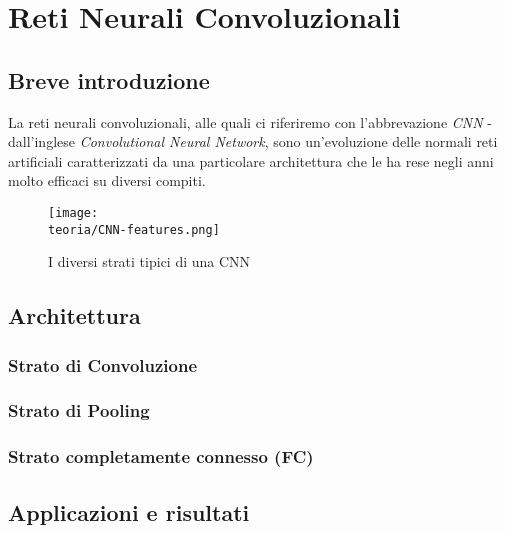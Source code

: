 
\chapter{Reti Neurali Convoluzionali} %

\label{Capitolo2} %
\def \teoria {Figures/teoria}


\section{Breve introduzione}
La reti neurali convoluzionali, alle quali ci riferiremo con l'abbrevazione \emph{CNN} - dall'inglese \emph{Convolutional Neural Network}, sono un'evoluzione delle normali reti artificiali caratterizzati da una particolare architettura che le ha rese negli anni molto efficaci su diversi compiti. 


\begin{figure}[h!]
 \centering
 \texttt{[image: \\teoria/CNN-features.png]} 
 \caption{I diversi strati tipici di una CNN}
 \label{fig:conv1}
\end{figure}


\section{Architettura}
\subsection{Strato di Convoluzione}

\subsection{Strato di Pooling}

\subsection{Strato completamente connesso (FC)}



\section{Applicazioni e risultati}



